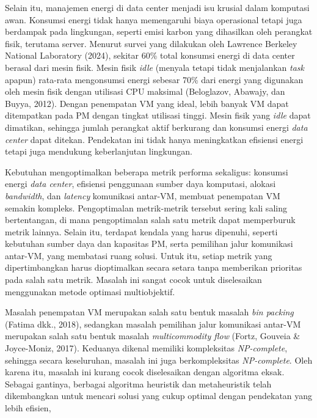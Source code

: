 Selain itu, manajemen energi di data center menjadi isu krusial dalam komputasi awan. Konsumsi energi tidak hanya memengaruhi biaya operasional tetapi juga berdampak pada lingkungan, seperti emisi karbon yang dihasilkan oleh perangkat fisik, terutama server. Menurut survei yang dilakukan oleh Lawrence Berkeley National Laboratory (2024), sekitar 60\% total konsumsi energi di data center berasal dari mesin fisik. Mesin fisik \textit{idle} (menyala tetapi tidak menjalankan \textit{task} apapun) rata-rata mengonsumsi energi sebesar 70\% dari energi yang digunakan oleh mesin fisik dengan utilisasi CPU maksimal (Beloglazov, Abawajy, dan Buyya, 2012). Dengan penempatan VM yang ideal, lebih banyak VM dapat ditempatkan pada PM dengan tingkat utilisasi tinggi. Mesin fisik yang \textit{idle} dapat dimatikan, sehingga jumlah perangkat aktif berkurang dan konsumsi energi \textit{data center} dapat ditekan. Pendekatan ini tidak hanya meningkatkan efisiensi energi tetapi juga mendukung keberlanjutan lingkungan.

Kebutuhan mengoptimalkan beberapa metrik performa sekaligus: konsumsi energi \textit{data center}, efisiensi penggunaan sumber daya komputasi, alokasi \textit{bandwidth}, dan \textit{latency} komunikasi antar-VM, membuat penempatan VM semakin kompleks. Pengoptimalan metrik-metrik tersebut sering kali saling bertentangan, di mana pengoptimalan salah satu metrik dapat memperburuk metrik lainnya. Selain itu, terdapat kendala yang harus dipenuhi, seperti kebutuhan sumber daya dan kapasitas PM, serta pemilihan jalur komunikasi antar-VM, yang membatasi ruang solusi. Untuk itu, setiap metrik yang dipertimbangkan harus dioptimalkan secara setara tanpa memberikan prioritas pada salah satu metrik. Masalah ini sangat cocok untuk diselesaikan menggunakan metode optimasi multiobjektif.

Masalah penempatan VM merupakan salah satu bentuk masalah \textit{bin packing} (Fatima dkk., 2018), sedangkan masalah pemilihan jalur komunikasi antar-VM merupakan salah satu bentuk masalah \textit{multicommodity flow} (Fortz, Gouveia \& Joyce-Moniz, 2017). Keduanya dikenal memiliki kompleksitas \textit{NP-complete}, sehingga secara keseluruhan, masalah ini juga berkompleksitas \textit{NP-complete}. Oleh karena itu, masalah ini kurang cocok diselesaikan dengan algoritma eksak. Sebagai gantinya, berbagai algoritma heuristik dan metaheuristik telah dikembangkan untuk mencari solusi yang cukup optimal dengan pendekatan yang lebih efisien,

